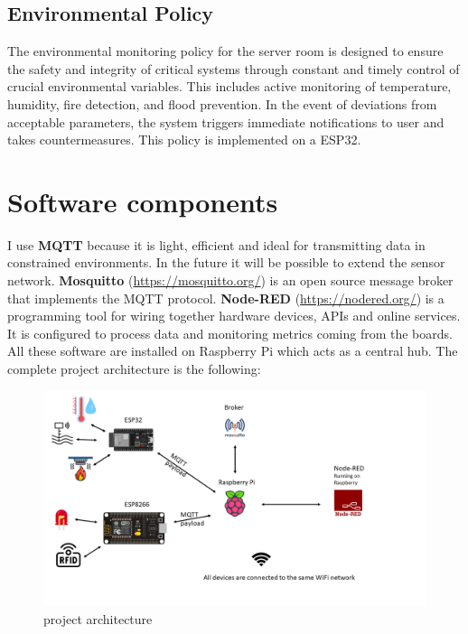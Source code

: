 \documentclass[]{scrartcl}
\begin{document}
\subsection{Environmental Policy}
The environmental monitoring policy for the server room is designed to ensure the safety and integrity of critical systems through constant and timely control of crucial environmental variables. This includes active monitoring of temperature, humidity, fire detection, and flood prevention. In the event of deviations from acceptable parameters, the system triggers immediate notifications to user and takes countermeasures. 
This policy is implemented on a ESP32.
\section{Software components}
I use \textbf{MQTT} because it is light, efficient and ideal for transmitting data in constrained
environments. In the future it will be possible to extend the sensor network.
\newline \newline
\textbf{Mosquitto} (\textcolor{blue}{\url{https://mosquitto.org/}}) is an open source message broker that implements
the MQTT protocol.
\newline \newline
\textbf{Node-RED} (\textcolor{blue}{\url{https://nodered.org/}}) is a programming tool for wiring together hardware
devices, APIs and online services. It is configured to process data and monitoring metrics coming from the boards.
\newline \newline
All these software are installed on Raspberry Pi which acts as a central hub.
\newline \newline
The complete project architecture is the following:
\begin{figure}[h!]
	\centering
	\includegraphics[width=\textwidth]{schema-iot.png}
	\caption{project architecture}
\end{figure}
\end{document}
